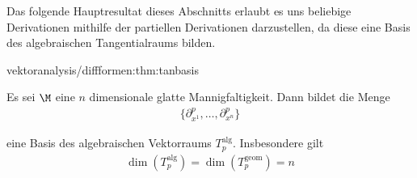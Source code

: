 \documentclass[letterpaper,10pt,english]{jupyterBook}
\begin{document}
\par
Das folgende Hauptresultat dieses Abschnitts erlaubt es uns beliebige Derivationen mithilfe der partiellen Derivationen darzustellen, da diese eine Basis des algebraischen Tangentialraums bilden.
\begin{theorem}{}{vektoranalysis/diffformen:thm:tanbasis}



\par
Es sei \(\M\) eine \(n\) dimensionale glatte Mannigfaltigkeit.
Dann bildet die Menge
\begin{align*}
\{\partial_{x^1}^p,\ldots,\partial_{x^n}^p\}
\end{align*}
\par
eine Basis des algebraischen Vektorraums \(T^{\text{alg}}_p\).
Insbesondere gilt
\begin{align*}
\dim(T^{\text{alg}}_p)=\dim(T^{\text{geom}}_p)=n
\end{align*}\end{theorem}
\end{document}
